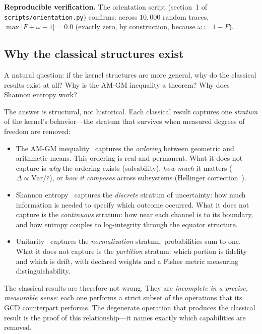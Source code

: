 \documentclass[
  aps,
  prd,
  twocolumn,
  superscriptaddress,
  nofootinbib,
  floatfix
]{revtex4-2}
\begin{document}
\noindent\textbf{Reproducible verification.}
The orientation script (section~1 of
\texttt{scripts/orientation.py}) confirms: across $10{,}000$
random traces, $\max|F + \omega - 1| = 0.0$ (exactly zero,
by construction, because $\omega \coloneqq 1 - F$).

\subsection{Why the classical structures exist}

A natural question: if the kernel structures are more general,
why do the classical results exist at all?  Why is the
AM-GM inequality a theorem?  Why does Shannon entropy work?

The answer is structural, not historical.
Each classical result captures one \emph{stratum} of the
kernel's behavior---the stratum that survives when
measured degrees of freedom are removed:

\begin{itemize}[leftmargin=*]
\item The AM-GM inequality~\cite{hardylittlewoodpolya1952}
  captures the \emph{ordering} between geometric and arithmetic
  means.  This ordering is real and permanent.  What it does not
  capture is \emph{why} the ordering exists (solvability),
  \emph{how much} it matters
  ($\Delta \propto \mathrm{Var}/\bar{c}$), or \emph{how it
  composes} across subsystems
  (Hellinger correction~\cite{hellinger1909}).

\item Shannon entropy~\cite{shannon1948} captures the
  \emph{discrete} stratum of uncertainty: how much information
  is needed to specify which outcome occurred.  What it does not
  capture is the \emph{continuous} stratum: how near each channel is to
  its boundary, and how entropy couples to log-integrity
  through the equator structure.

\item Unitarity~\cite{weinberg1995qft1} captures the
  \emph{normalization} stratum: probabilities sum to one.
  What it does not capture is the \emph{partition} stratum: which portion is fidelity
  and which is drift, with declared weights and a Fisher
  metric measuring distinguishability.
\end{itemize}

The classical results are therefore not wrong.  They are
\emph{incomplete in a precise, measurable sense}: each one
performs a strict subset of the operations that its GCD
counterpart performs.  The degenerate operation that
produces the classical result is the proof of this
relationship---it names exactly which capabilities are
removed.
\end{document}
